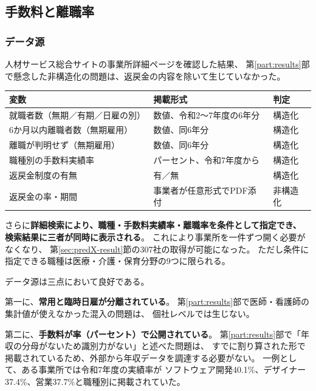 \subsection{手数料と離職率}

\subsubsection{データ源}
\label{sec:jinzai-structure}

人材サービス総合サイトの事業所詳細ページを確認した結果、
第\ref{part:results}部で懸念した非構造化の問題は、返戻金の内容を除いて生じていなかった。

\begin{center}
\begin{tabularx}{\textwidth}{@{}lXl@{}}
\toprule
変数 & 掲載形式 & 判定 \\
\midrule
就職者数（無期／有期／日雇の別） & 数値、令和2〜7年度の6年分 & 構造化 \\
6か月以内離職者数（無期雇用） & 数値、同6年分 & 構造化 \\
離職が判明せず（無期雇用） & 数値、同6年分 & 構造化 \\
職種別の手数料実績率 & パーセント、令和7年度から & 構造化 \\
返戻金制度の有無 & 有／無 & 構造化 \\
返戻金の率・期間 & 事業者が任意形式でPDF添付 & 非構造化 \\
\bottomrule
\end{tabularx}
\label{tab:jinzai-variables}
\end{center}

さらに\textbf{詳細検索により、職種・手数料実績率・離職率を条件として指定でき、
検索結果に三者が同時に表示される}。
これにより事業所を一件ずつ開く必要がなくなり、
第\ref{sec:predX-result}節の307社の取得が可能になった。
ただし条件に指定できる職種は医療・介護・保育分野の9つに限られる。

データ源は三点において良好である。

第一に、\textbf{常用と臨時日雇が分離されている}。
第\ref{part:results}部で医師・看護師の集計値が使えなかった混入の問題は、
個社レベルでは生じない。

第二に、\textbf{手数料が率（パーセント）で公開されている}。
第\ref{part:results}部で「年収の分母がないため識別力がない」と述べた問題は、
すでに割り算された形で掲載されているため、外部から年収データを調達する必要がない。
一例として、ある事業所では令和7年度の実績率が
ソフトウェア開発40.1\%、デザイナー37.4\%、営業37.7\%と職種別に掲載されていた。

